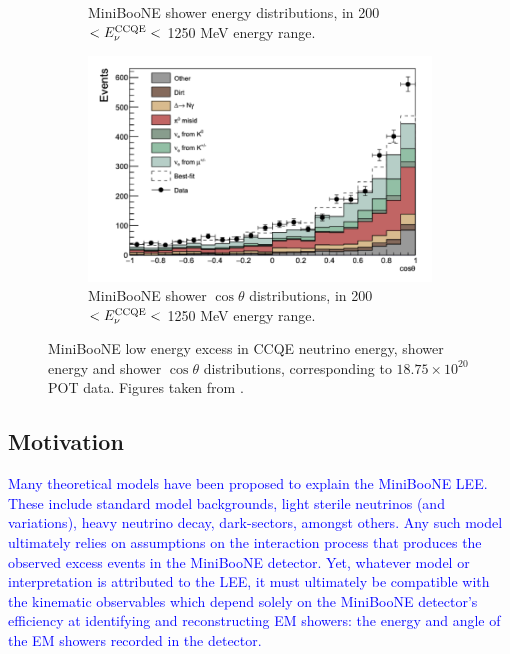 \begin{figure}[H]
\begin{subfigure}{0.49\linewidth}
        \caption{MiniBooNE shower energy distributions, in 200 $< E_{\nu}^{\rm{CCQE}} <$ 1250 MeV energy range.}
    \end{subfigure}    
    \begin{subfigure}{0.49\linewidth}
        \includegraphics[width=\linewidth]{technote/SignalModel/Figures/MB ShwAngle.png}
        \caption{MiniBooNE shower $\cos\theta$ distributions, in 200 $< E_{\nu}^{\rm{CCQE}} <$ 1250 MeV energy range.}
    \end{subfigure}
    \caption{MiniBooNE low energy excess in CCQE neutrino energy, shower energy and shower $\cos\theta$ distributions, corresponding to $18.75\times 10^{20}$ POT data. Figures taken from \cite{MiniBooNEpaper}.}
    \label{fig:MBLEE}
\end{figure}

\subsection{Motivation} \textcolor{blue}{Many theoretical models have been proposed to explain the MiniBooNE LEE. These include standard model backgrounds, light sterile neutrinos (and variations), heavy neutrino decay, dark-sectors, amongst others. Any such model ultimately relies on assumptions on the interaction process that produces the observed excess events in the MiniBooNE detector. Yet, whatever model or interpretation is attributed to the LEE, it must ultimately be compatible with the kinematic observables which depend solely on the MiniBooNE detector's efficiency at identifying and reconstructing EM showers: the energy and angle of the EM showers recorded in the detector.}

